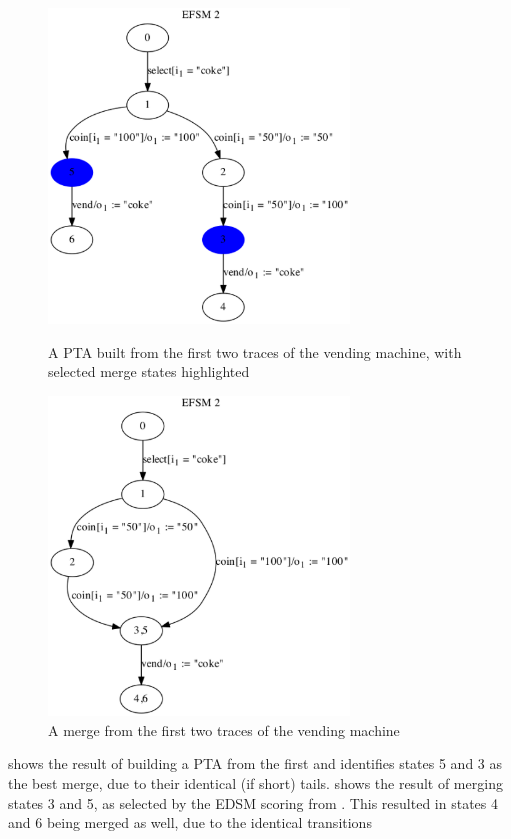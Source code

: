 \begin{figure}[h]
\begin{center}
\begin{minipage}{0.45\textwidth}
\includegraphics[width=8cm]{figures/efsm/premerge.eps}
\caption{A PTA built from the first two traces of the vending machine, with selected merge states highlighted}
\label{fig:premerge}
\end{minipage}
\begin{minipage}{0.45\textwidth}
\includegraphics[width=8cm]{figures/efsm/merge1.eps}
\caption{A merge from the first two traces of the vending machine}
\label{fig:merge}
\end{minipage}
\end{center}
\end{figure}

 shows the result of building a PTA from the first and identifies states 5 and 3 as the best merge, due to their identical (if short) tails.  shows the result of merging states 3 and 5, as selected by the EDSM scoring from . This resulted in states 4 and 6 being merged as well, due to the identical transitions 

